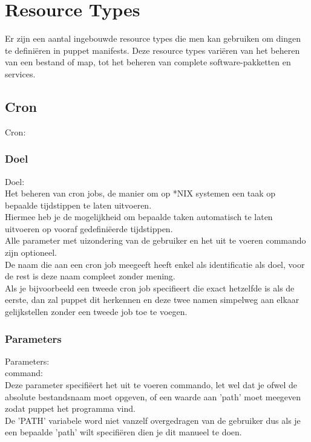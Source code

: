 \chapter{Resource Types}

Er zijn een aantal ingebouwde resource types die men kan gebruiken om dingen te defini\"{e}ren in puppet manifests. Deze resource types vari\"{e}ren van het beheren van een bestand of map, tot het beheren van complete software-pakketten en services.\\


\section{Cron}
Cron:\\
\subsection{Doel}
Doel:\\
	Het beheren van cron jobs, de manier om op *NIX systemen een taak op bepaalde tijdstippen te laten uitvoeren.\\
	Hiermee heb je de mogelijkheid om bepaalde taken automatisch te laten uitvoeren op vooraf gedefini\"{e}erde tijdstippen.\\
	Alle parameter met uizondering van de gebruiker en het uit te voeren commando zijn optioneel.\\

	De naam die aan een cron job meegeeft heeft enkel als identificatie als doel, voor de rest is deze naam compleet zonder mening.\\
	Als je bijvoorbeeld een tweede cron job specifieert die exact hetzelfde is als de eerste, dan zal puppet dit herkennen en deze twee namen simpelweg aan elkaar gelijkstellen zonder een tweede job toe te voegen.\\



\subsection{Parameters}
Parameters:\\

		command:\\
		Deze parameter specifi\"{e}ert het uit te voeren commando, let wel dat je ofwel de absolute bestandsnaam moet opgeven, of een waarde aan 'path' moet meegeven zodat puppet het programma vind.\\
		De 'PATH' variabele word niet vanzelf overgedragen van de gebruiker dus als je een bepaalde 'path' wilt specifi\"{e}ren dien je dit manueel te doen.\\

